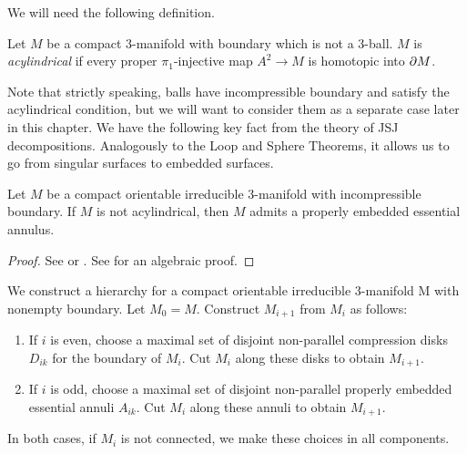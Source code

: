 We will need the following definition.

\begin{defn}

Let $M$ be a compact $3$-manifold with boundary which is not a 3-ball. $M$ is
\emph{acylindrical} if every proper $\pi_1$-injective map $A^2 \to M$ is
homotopic into $\partial M$.

\end{defn}

Note that strictly speaking, balls have incompressible boundary and satisfy the
acylindrical condition, but we will want to consider them as a separate case
later in this chapter. We have the following key fact from the theory of JSJ
decompositions.  Analogously to the Loop and Sphere Theorems, it allows us to
go from singular surfaces to embedded surfaces.

\begin{thm}

Let $M$ be a compact orientable irreducible $3$-manifold with incompressible
boundary. If $M$ is not acylindrical, then $M$ admits a properly embedded
essential annulus.

\end{thm}

\begin{proof}

See \cite{JacoShalen} or \cite{Johannson}. See \cite{Scottannulus} for an
algebraic proof.

\end{proof}

We construct a hierarchy for a compact orientable irreducible $3$-manifold
M with nonempty boundary.  Let $M_0 = M$.  Construct $M_{i+1}$ from $M_i$ as
follows:

\begin{enumerate}

\item If $i$ is even, choose a maximal set of disjoint non-parallel compression
disks $D_{ik}$ for the boundary of $M_i$. Cut $M_i$ along these disks to obtain
$M_{i+1}$.

\item If $i$ is odd, choose a maximal set of disjoint non-parallel properly
embedded essential annuli $A_{ik}$. Cut $M_i$ along these annuli to obtain
$M_{i+1}$.

\end{enumerate}

In both cases, if $M_i$ is not connected, we make these choices in all
components.

